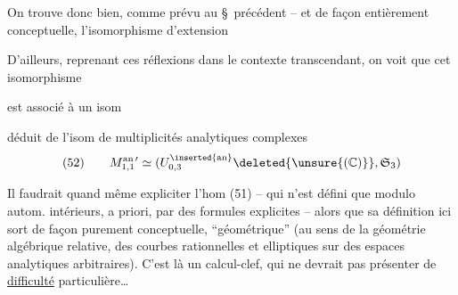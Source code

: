 On trouve donc bien, comme prévu au
\S\ précédent -- et de façon entièrement
conceptuelle, l'isomorphisme 
 d'extension



D'ailleurs, reprenant ces réflexions dans le
contexte transcendant, on voit que
cet isomorphisme


est associé à un isom

déduit de l'isom de multiplicités analytiques
complexes
\[
(52)\qquad M_{1,1}^{\mathrm{an}\,\prime}\simeq
(U_{0,3}^{\inserted{\mathrm{an}}}\deleted{\unsure{(\mathbb C)}},\mathfrak S_3)
\]

Il faudrait quand même expliciter
l'hom (51) -- qui n'est défini que
modulo autom. intérieurs, a priori,
par des formules explicites -- alors que
sa définition ici sort de façon purement conceptuelle, ``géométrique'' (au sens
de la géométrie algébrique relative, des
courbes rationnelles et elliptiques sur des
espaces analytiques arbitraires). C'est là
un calcul-clef,  qui ne devrait pas
présenter de \uline{difficulté} particulière\ldots


